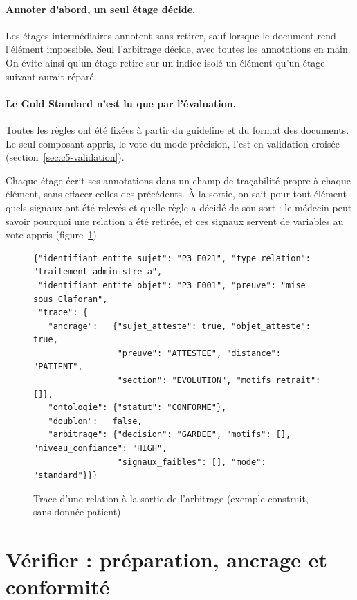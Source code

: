 \paragraph{Annoter d'abord, un seul étage décide.} Les étages intermédiaires annotent sans retirer, sauf lorsque le document rend l'élément impossible. Seul l'arbitrage décide, avec toutes les annotations en main. On évite ainsi qu'un étage retire sur un indice isolé un élément qu'un étage suivant aurait réparé.

\paragraph{Le Gold Standard n'est lu que par l'évaluation.} Toutes les règles ont été fixées à partir du guideline et du format des documents. Le seul composant appris, le vote du mode précision, l'est en validation croisée (section~\ref{sec:c5-validation}).

Chaque étage écrit ses annotations dans un champ de traçabilité propre à chaque élément, sans effacer celles des précédents. À la sortie, on sait pour tout élément quels signaux ont été relevés et quelle règle a décidé de son sort : le médecin peut savoir pourquoi une relation a été retirée, et ces signaux servent de variables au vote appris (figure~\ref{fig:c5-trace}).

\begin{figure}[H]
\centering
\begin{minipage}{0.92\linewidth}
\footnotesize
\begin{verbatim}
{"identifiant_entite_sujet": "P3_E021", "type_relation": "traitement_administre_a",
 "identifiant_entite_objet": "P3_E001", "preuve": "mise sous Claforan",
 "trace": {
   "ancrage":   {"sujet_atteste": true, "objet_atteste": true,
                 "preuve": "ATTESTEE", "distance": "PATIENT",
                 "section": "EVOLUTION", "motifs_retrait": []},
   "ontologie": {"statut": "CONFORME"},
   "doublon":   false,
   "arbitrage": {"decision": "GARDEE", "motifs": [], "niveau_confiance": "HIGH",
                 "signaux_faibles": [], "mode": "standard"}}}
\end{verbatim}
\end{minipage}
\caption{Trace d'une relation à la sortie de l'arbitrage (exemple construit, sans donnée patient)}\label{fig:c5-trace}
\end{figure}

\section{Vérifier : préparation, ancrage et conformité}\label{sec:c5-verifier}

